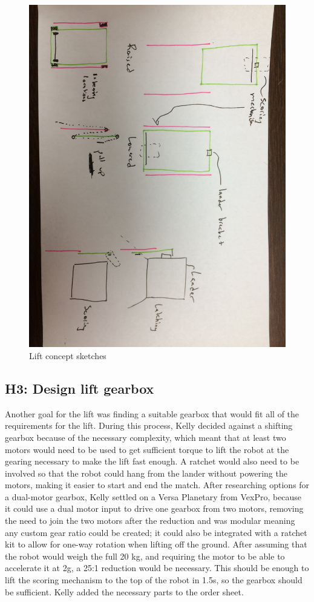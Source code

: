 \documentclass{article}
\begin{document}
\begin{figure}
    \centering
    \includegraphics[width=.75\textwidth]{04_09-24/images/lift.jpg}
    \caption{Lift concept sketches}
    \label{fig:lift}
\end{figure}

\subsection{H3: Design lift gearbox}

Another goal for the lift was finding a suitable gearbox that would fit all of the requirements for the lift. During this process, Kelly decided against a shifting gearbox because of the necessary complexity, which meant that at least two motors would need to be used to get sufficient torque to lift the robot at the gearing necessary to make the lift fast enough. A ratchet would also need to be involved so that the robot could hang from the lander without powering the motors, making it easier to start and end the match. After researching options for a dual-motor gearbox, Kelly settled on a Versa Planetary from VexPro, because it could use a dual motor input to drive one gearbox from two motors, removing the need to join the two motors after the reduction and was modular meaning any custom gear ratio could be created; it could also be integrated with a ratchet kit to allow for one-way rotation when lifting off the ground. After assuming that the robot would weigh the full 20 kg, and requiring the motor to be able to accelerate it at 2g, a 25:1 reduction would be necessary. This should be enough to lift the scoring mechanism to the top of the robot in 1.5s, so the gearbox should be sufficient. Kelly added the necessary parts to the order sheet.
\end{document}

